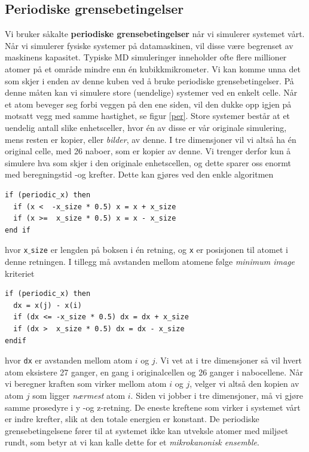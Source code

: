 \documentclass[paper=a4, fontsize=11pt]{scrartcl} %
\numberwithin{equation}{section} %
\numberwithin{figure}{section} %
\numberwithin{table}{section} %
\begin{document}
\subsection{Periodiske grensebetingelser}
Vi bruker såkalte \textbf{periodiske grensebetingelser} når vi simulerer systemet vårt. Når vi simulerer fysiske systemer på datamaskinen, vil disse være begrenset av maskinens kapasitet. Typiske MD simuleringer inneholder ofte flere millioner atomer på et område mindre enn én kubikkmikrometer. Vi kan komme unna det som skjer i enden av denne kuben ved å bruke periodiske grensebetingelser. På denne måten kan vi simulere store (uendelige) systemer ved en enkelt celle. Når et atom beveger seg forbi veggen på den ene siden, vil den dukke opp igjen på motsatt vegg med samme hastighet, se figur \ref{per}. Store systemer består at et uendelig antall slike enhetsceller, hvor én av disse er vår originale simulering, mens resten er kopier, eller \textit{bilder}, av denne. I tre dimensjoner vil vi altså ha én original celle, med 26 naboer, som er kopier av denne. Vi trenger derfor kun å simulere hva som skjer i den originale enhetscellen, og dette sparer oss enormt med beregningstid -og krefter. Dette kan gjøres ved den enkle algoritmen

\begin{lstlisting}
if (periodic_x) then
  if (x <  -x_size * 0.5) x = x + x_size
  if (x >=  x_size * 0.5) x = x - x_size
end if
\end{lstlisting}

hvor \texttt{x$\_$size} er lengden på boksen i én retning, og \texttt{x} er posisjonen til atomet i denne retningen. I tillegg må avstanden mellom atomene følge \textit{minimum image} kriteriet

\begin{lstlisting}
if (periodic_x) then
  dx = x(j) - x(i)
  if (dx <= -x_size * 0.5) dx = dx + x_size
  if (dx >  x_size * 0.5) dx = dx - x_size
endif
\end{lstlisting}

hvor \texttt{dx} er avstanden mellom atom $i$ og $j$. Vi vet at i tre dimensjoner så vil hvert atom eksistere 27 ganger, en gang i originalcellen og 26 ganger i nabocellene. Når vi beregner kraften som virker mellom atom $i$ og $j$, velger vi altså den kopien av atom $j$ som ligger \textit{nærmest} atom $i$.  Siden vi jobber i tre dimensjoner, må vi gjøre samme prosedyre i y -og z-retning. De eneste kreftene som virker i systemet vårt er indre krefter, slik at den totale energien er konstant. De periodiske grensebetingelsene fører til at systemet ikke kan utveksle atomer med miljøet rundt, som betyr at vi kan kalle dette for et \textit{mikrokanonisk ensemble}. 
\end{document}
